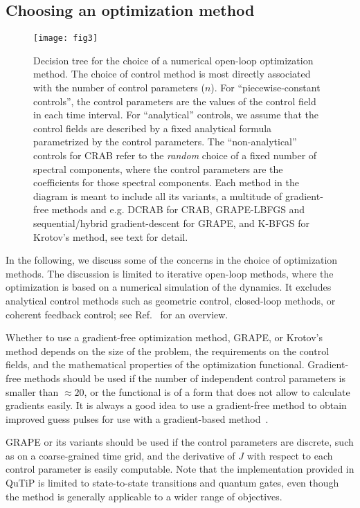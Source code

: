 \documentclass[submission, Phys]{SciPost}
\begin{document}
\subsection{Choosing an optimization method}%
\label{sec:comparison_choose_method}

\begin{figure}[tb]
\centering \texttt{[image: fig3]}
  \caption{Decision tree for the choice of a numerical open-loop optimization
  method.
  The choice of control method is most directly associated with the number
  of control parameters ($n$).
  For ``piecewise-constant controls'', the control parameters are the values of
  the control field in each time interval. For ``analytical'' controls, we
  assume that the control fields are described by a fixed
  analytical formula parametrized by the control parameters.
  The ``non-analytical'' controls for CRAB refer to
  the \emph{random} choice of a fixed number of spectral components, where the
  control parameters are the coefficients for those spectral components.
  Each method in the diagram is meant to include all its variants, a multitude
  of gradient-free methods and e.g. DCRAB for CRAB, GRAPE-LBFGS and
  sequential/hybrid gradient-descent for GRAPE, and K-BFGS for Krotov's method,
  see text for detail.
  }%
\label{fig:octdecisiontree}
\end{figure}

In the following, we discuss some of the concerns in the choice of optimization
methods.
The discussion is limited to iterative open-loop methods, where the optimization
is based on a numerical simulation of the dynamics.
It excludes analytical control methods such as geometric control, closed-loop
methods, or coherent feedback control; see Ref.~\cite{PetersenIETCTA2010} for an
overview.

Whether to use a gradient-free optimization method, GRAPE, or Krotov's method
depends on the size of the problem, the requirements on the control fields, and
the mathematical properties of the optimization functional.
Gradient-free methods should be used if the number of independent control
parameters is smaller than $\approx 20$, or the functional is of a form that
does not allow to calculate gradients easily.
It is always a good idea to use a gradient-free method to obtain improved guess
pulses for use with a gradient-based method~\cite{GoerzEPJQT2015}.

GRAPE or its variants should be used if the control parameters are discrete,
such as on a coarse-grained time grid, and the derivative of $J$ with respect to
each control parameter is easily computable.
Note that the implementation provided in QuTiP is limited to state-to-state
transitions and quantum gates, even though the method is generally applicable to
a wider range of objectives.
\end{document}
